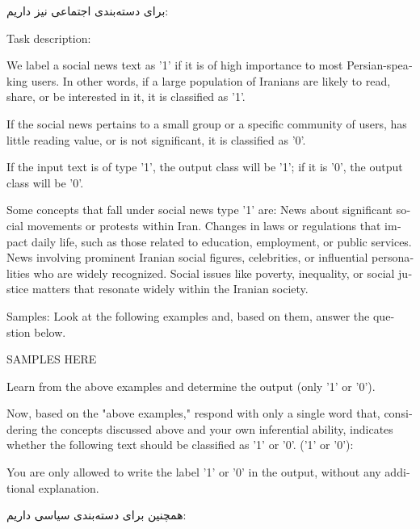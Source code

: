 برای دسته‌بندی اجتماعی نیز داریم:

\vspace{5pt}
\begin{scriptsize}
\begin{itshape}
\begin{latin}
\LTR
Task description:

We label a social news text as '1' if it is of high importance to most Persian-speaking users. In other words, if a large population of Iranians are likely to read, share, or be interested in it, it is classified as '1'.

If the social news pertains to a small group or a specific community of users, has little reading value, or is not significant, it is classified as '0'.

If the input text is of type '1', the output class will be '1'; if it is '0', the output class will be '0'.

Some concepts that fall under social news type '1' are:
News about significant social movements or protests within Iran.
Changes in laws or regulations that impact daily life, such as those related to education, employment, or public services.
News involving prominent Iranian social figures, celebrities, or influential personalities who are widely recognized.
Social issues like poverty, inequality, or social justice matters that resonate widely within the Iranian society.

Samples: Look at the following examples and, based on them, answer the question below.

SAMPLES HERE

Learn from the above examples and determine the output (only '1' or '0').

Now, based on the "above examples," respond with only a single word that, considering the concepts discussed above and your own inferential ability, indicates whether the following text should be classified as '1' or '0'. ('1' or '0'):

You are only allowed to write the label '1' or '0' in the output, without any additional explanation.
\RTL
\end{latin}
\end{itshape}
\end{scriptsize}
\vspace{5pt}

همچنین برای دسته‌بندی سیاسی داریم:

